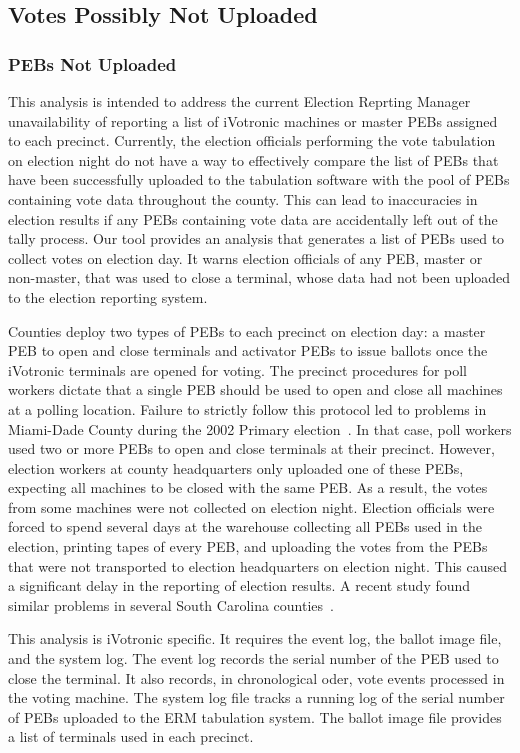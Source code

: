 \subsection{Votes Possibly Not Uploaded}
\subsubsection{PEBs Not Uploaded}
This analysis is intended to address the current Election Reprting Manager unavailability of reporting  a list of iVotronic machines or master PEBs assigned to each precinct. Currently, the election officials performing the vote tabulation on election night do not have a way to effectively compare the list of PEBs that have been successfully uploaded to the tabulation software with the pool of PEBs containing vote data throughout the county. This can lead to inaccuracies in election results if any PEBs containing vote data are accidentally left out of the tally process. Our tool provides an analysis that generates a list of PEBs used to collect votes on election day. It warns election officials of any PEB, master or non-master, that was used to close a terminal, whose data had not been uploaded to the election reporting system.   

Counties deploy two types of PEBs to each precinct on election day: a master PEB to open and close terminals and activator PEBs to issue ballots once the iVotronic terminals are opened for voting. The precinct procedures for poll workers dictate that a single PEB should be used to open and close all machines at a polling location. Failure to strictly follow this protocol led to problems in Miami-Dade County during the 2002 Primary election~\cite{Mazella2002}. In that case, poll workers used two or more PEBs to open and close terminals at their precinct.  However, election workers at county headquarters only uploaded one of these PEBs, expecting all machines to be closed with the same PEB. As a result, the votes from some machines were not collected on election night.  Election officials were forced to spend several days at the warehouse collecting all PEBs used in the election, printing tapes of every PEB, and uploading the votes from the PEBs that were not transported to election headquarters on election night. This caused a significant delay in the reporting of election results. A recent study found similar problems in several South Carolina counties~\cite{Buell2011}.

 This analysis is iVotronic specific. It requires the event log, the ballot image file, and the system log. The event log records the serial number of the PEB used to close the terminal.  It also records, in chronological oder, vote events processed in the voting machine. The system log file tracks a running log of the serial number of PEBs uploaded to the ERM tabulation system. The ballot image file provides a list of terminals used in each precinct.


